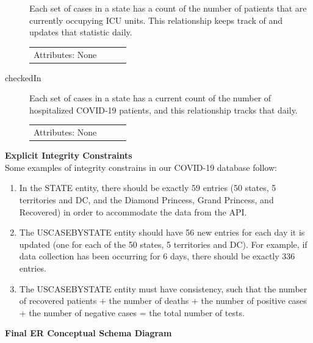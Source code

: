 \documentclass[11pt]{article}
\begin{document}
\begin{description}
\noindent
Each set of cases in a state has a count of the number of patients that are currently occupying ICU units. This relationship keeps track of and updates that statistic daily.

\begin{tabular}{lllc}
    Attributes: None \\
\end{tabular}

\item [checkedIn]

\noindent
Each set of cases in a state has a current count of the number of hospitalized COVID-19 patients, and this relationship tracks that daily.

\begin{tabular}{lllc}
    Attributes: None \\
\end{tabular}

\end{description}

\noindent
\textbf{Explicit Integrity Constraints} \\

\noindent
Some examples of integrity constrains in our COVID-19 database follow:

\begin{enumerate}
    \item In the STATE entity, there should be exactly 59 entries (50 states, 5 territories and DC, and the Diamond Princess, Grand Princess, and Recovered) in order to accommodate the data from the API.
    \item The USCASEBYSTATE entity should have 56 new entries for each day it is updated (one for each of the 50 states, 5 territories and DC). For example, if data collection has been occurring for 6 days, there should be exactly 336 entries.
    \item The USCASEBYSTATE entity must have consistency, such that the number of recovered patients + the number of deaths + the number of positive cases + the number of negative cases = the total number of tests.
\end{enumerate}

\pagebreak

\noindent
\textbf{Final ER Conceptual Schema Diagram}
\end{document}
